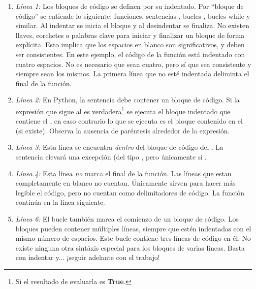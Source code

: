 \begin{enumerate}

\item \emph{Línea 1:} Los bloques de código se definen por su indentado. Por ``bloque de código'' se entiende lo siguiente: funciones, sentencias , bucles , bucles {while} y similar. Al indentar se inicia el bloque y al desindentar se finaliza. No existen llaves, corchetes o palabras clave para iniciar y finalizar un bloque de forma explícita. Esto implica que los espacios en blanco son significativos, y deben ser consistentes. En este ejemplo, el código de la función está indentado con cuatro espacios. No es necesario que sean cuatro, pero sí que sea consistente y siempre sean los mismos. La primera línea que no esté indentada deliminta el final de la función.

\item \emph{Línea 2:} En Python, la sentencia  debe contener un bloque de código. Si la expresión que sigue al  es verdadera\footnote{Si el resultado de evaluarla es \textbf{True}.} se ejecuta el bloque indentado que contiene el , en caso contrario lo que se ejecuta es el bloque contenido en el  (si existe). Observa la ausencia de paréntesis alrededor de la expresión.

\item \emph{Línea 3:} Esta línea se encuentra \emph{dentro} del bloque de código del . La sentencia  elevará una excepción (del tipo , pero únicamente si .

\item \emph{Línea 4:} Esta línea \emph{no} marca el final de la función. Las líneas que estan completamente en blanco no cuentan. Únicamente sirven para hacer más legible el código, pero no cuentan como delimitadores de código. La función continúa en la línea siguiente.

\item \emph{Línea 6:} El bucle  también marca el comienzo de un bloque de código. Los bloques pueden contener múltiples líneas, siempre que estén indentadas con el mismo número de espacios. Este bucle  contiene tres líneas de código en él. No existe ninguna otra sintáxis especial para los bloques de varias líneas. Basta con indentar y... ¡seguir adelante con el trabajo!

\end{enumerate}


